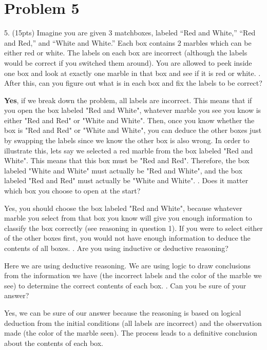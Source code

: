 \documentclass{article}
\begin{document}
\clearpage

\section{Problem 5}

5. (15pts) Imagine you are given 3 matchboxes, labeled “Red and White,” “Red and Red,”
and “White and White.” Each box contains 2 marbles which can be either red or white.
The labels on each box are incorrect (although the labels would be correct if you
switched them around). You are allowed to peek inside one box and look at exactly one
marble in that box \- and see if it is red or white.
. After this, can you figure out what is in each box and fix the labels to be correct?

{\bf Yes}, if we break down the problem, all labels are incorrect. This means that if you open the box labeled "Red and White", whatever marble you see you know is either "Red and Red" or "White and White". Then, once you know whether the box is "Red and Red" or "White and White", you can deduce the other boxes just by swapping the labels since we know the other box is also wrong. In order to illustrate this, lets say we selected a red marble from the box labeled "Red and White". This means that this box must be "Red and Red". Therefore, the box labeled "White and White" must actually be "Red and White", and the box labeled "Red and Red" must actually be "White and White".
. Does it matter which box you choose to open at the start?

Yes, you should choose the box labeled "Red and White", because whatever marble you select from that box you know will give you enough information to classify the box correctly (see reasoning in question 1). If you were to select either of the other boxes first, you would not have enough information to deduce the contents of all boxes.
. Are you using inductive or deductive reasoning?

Here we are using deductive reasoning. We are using logic to draw conclusions from the information we have (the incorrect labels and the color of the marble we see) to determine the correct contents of each box.
. Can you be sure of your answer?

Yes, we can be sure of our answer because the reasoning is based on logical deduction from the initial conditions (all labels are incorrect) and the observation made (the color of the marble seen). The process leads to a definitive conclusion about the contents of each box.
\end{document}
